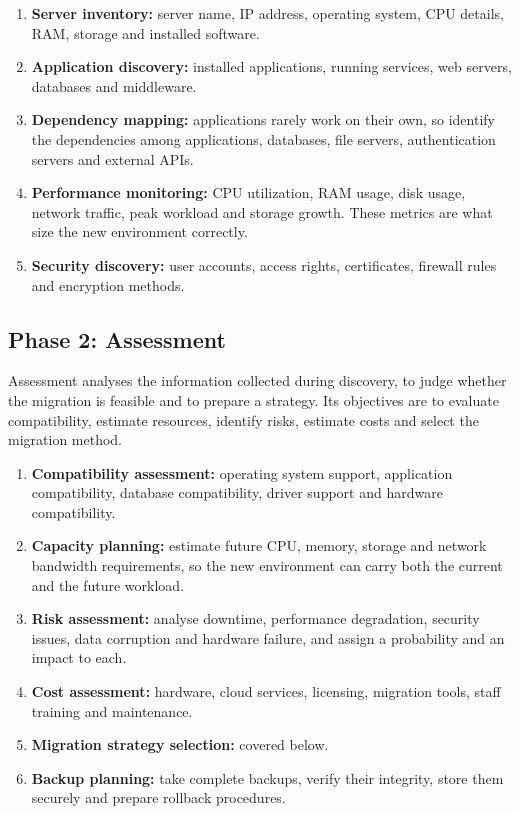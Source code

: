 \documentclass[11pt,a4paper]{article}
\begin{document}
\begin{enumerate}\itemsep3pt
  \item \textbf{Server inventory:} server name, IP address, operating system, CPU details,
        RAM, storage and installed software.
  \item \textbf{Application discovery:} installed applications, running services, web servers,
        databases and middleware.
  \item \textbf{Dependency mapping:} applications rarely work on their own, so identify the
        dependencies among applications, databases, file servers, authentication servers and
        external APIs.
  \item \textbf{Performance monitoring:} CPU utilization, RAM usage, disk usage, network
        traffic, peak workload and storage growth. These metrics are what size the new
        environment correctly.
  \item \textbf{Security discovery:} user accounts, access rights, certificates, firewall
        rules and encryption methods.
\end{enumerate}

\subsection{Phase 2: Assessment}

Assessment analyses the information collected during discovery, to judge whether the migration
is feasible and to prepare a strategy. Its objectives are to evaluate compatibility, estimate
resources, identify risks, estimate costs and select the migration method.

\begin{enumerate}\itemsep3pt
  \item \textbf{Compatibility assessment:} operating system support, application compatibility,
        database compatibility, driver support and hardware compatibility.
  \item \textbf{Capacity planning:} estimate future CPU, memory, storage and network bandwidth
        requirements, so the new environment can carry both the current and the future
        workload.
  \item \textbf{Risk assessment:} analyse downtime, performance degradation, security issues,
        data corruption and hardware failure, and assign a probability and an impact to each.
  \item \textbf{Cost assessment:} hardware, cloud services, licensing, migration tools, staff
        training and maintenance.
  \item \textbf{Migration strategy selection:} covered below.
  \item \textbf{Backup planning:} take complete backups, verify their integrity, store them
        securely and prepare rollback procedures.
\end{enumerate}
\end{document}
